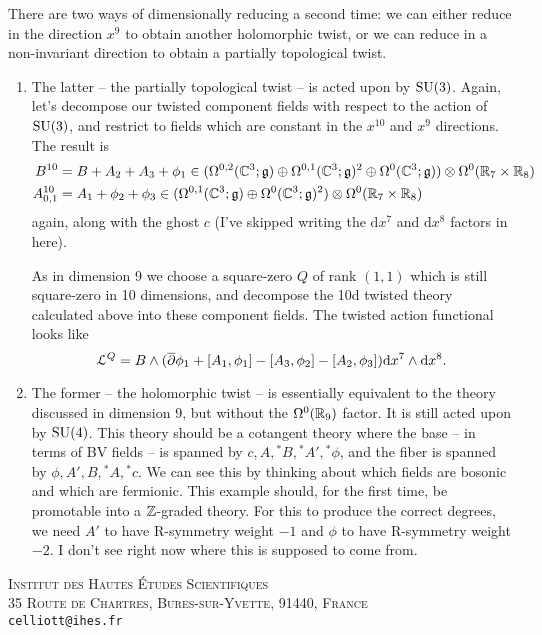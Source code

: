 \documentclass[10pt, oneside]{article}
\renewcommand{\d}{\mathrm{d}}
\newcommand{\st}[1]{{}^*{#1}}
\begin{document}
\begin{example}[8d $\mc N=1$ Super Yang-Mills]
There are two ways of dimensionally reducing a second time: we can either reduce in the direction $x^9$ to obtain another holomorphic twist, or we can reduce in a non-invariant direction to obtain a partially topological twist.  

\begin{enumerate}
\item The latter -- the partially topological twist -- is acted upon by $\mathrm{SU}(3)$.  Again, let's decompose our twisted component fields with respect to the action of $\mathrm{SU}(3)$, and restrict to fields which are constant in the $x^{10}$ and $x^9$ directions.  The result is
\begin{align*}
B^{10} &= B + A_2 + A_3 + \phi_1 \in (\Omega^{0,2}(\mathbb{C}^3; \mathfrak{g}) \oplus \Omega^{0,1}(\mathbb{C}^3; \mathfrak{g})^2\oplus \Omega^0(\mathbb{C}^3; \mathfrak{g})) \otimes \Omega^0(\mathbb{R}_7 \times \mathbb{R}_8)\\
A^{10}_{0,1} &= A_1 + \phi_2 + \phi_3 \in (\Omega^{0,1}(\mathbb{C}^3; \mathfrak{g}) \oplus \Omega^0(\mathbb{C}^3; \mathfrak{g})^2) \otimes \Omega^0(\mathbb{R}_7 \times \mathbb{R}_8)
\end{align*}
again, along with the ghost $c$ (I've skipped writing the $\d x^7$ and $\d x^8$ factors in here).

As in dimension 9 we choose a square-zero $Q$ of rank $(1,1)$ which is still square-zero in 10 dimensions, and decompose the 10d twisted theory calculated above into these component fields.  The twisted action functional looks like
\[\LL^Q = B \wedge (\ol \dd \phi_1 + [A_1,\phi_1] - [A_3,\phi_2] - [A_2,\phi_3]) \d x^7 \wedge \d x^8.\]

\item The former -- the holomorphic twist -- is essentially equivalent to the theory discussed in dimension 9, but without the $\Omega^0(\mathbb{R}_9)$ factor.  It is still acted upon by $\mathrm{SU}(4)$.  This theory should be a cotangent theory where the base -- in terms of BV fields -- is spanned by $c, A, \st B, \st A', \st \phi$, and the fiber is spanned by $\phi, A', B, \st A, \st c$.  We can see this by thinking about which fields are bosonic and which are fermionic.  This example should, for the first time, be promotable into a $\mathbb{Z}$-graded theory.  For this to produce the correct degrees, we need $A'$ to have R-symmetry weight $-1$ and $\phi$ to have R-symmetry weight $-2$.  I don't see right now where this is supposed to come from.
\end{enumerate}

\end{example}




\pagestyle{bib}
\printbibliography

\textsc{Institut des Hautes \'Etudes Scientifiques}\\
\textsc{35 Route de Chartres, Bures-sur-Yvette, 91440, France}\\
\texttt{celliott@ihes.fr}
\end{document}
